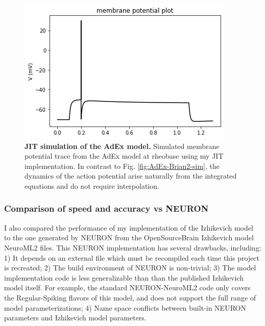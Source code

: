 \begin{figure}[!htb]
\begin{center}
\includegraphics[scale=0.7]{figures/backend_check_files/backend_check_4_2.png}
\caption[JIT simulation of the AdEx model]{\textbf{JIT simulation of the AdEx model.} Simulated membrane potential trace from the AdEx model at rheobase using my JIT implementation. In contrast to Fig. \ref{fig:AdEx-Brian2-sim}, the dynamics of the action potential arise naturally from the integrated equations and do not require interpolation.}
\label{fig:AdEx-JIT-sim}
\end{center}
\end{figure}

\subsubsection{Comparison of speed and accuracy vs NEURON}
I also compared the performance of my implementation of the Izhikevich model to the one generated by NEURON from the OpenSourceBrain Izhikevich model NeuroML2 files.
This NEURON implementation has several drawbacks, including: 1) It depends on an external file which must be recompiled each time this project is recreated; 2) The build environment of NEURON is non-trivial; 3) The model implementation code is less generalizable than than the published Izhikevich model itself.
For example, the standard NEURON-NeuroML2 code only covers the Regular-Spiking flavors of this model, and does not support the full range of model parameterizations; 4) Name space conflicts between built-in NEURON parameters and Izhikevich model parameters.  



